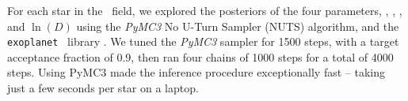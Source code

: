 
For each star in the \kepler\ field, we explored the posteriors of the four
parameters, \vx, \vy, \vz, and $\ln(D)$ using the {\it PyMC3} No U-Turn
Sampler (NUTS) algorithm, and the {\tt exoplanet} \python\ library
.
We tuned the {\it PyMC3} sampler for 1500 steps, with a target acceptance
fraction of 0.9, then ran four chains of 1000 steps for a total of 4000 steps.
Using PyMC3 made the inference procedure exceptionally fast -- taking just a
few seconds per star on a laptop.
